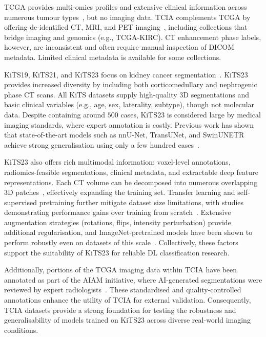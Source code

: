 TCGA provides multi-omics profiles and extensive clinical information across numerous tumour types~\cite{weinstein2013cancer}, but no imaging data. TCIA complements TCGA by offering de-identified CT, MRI, and PET imaging~\cite{clark2013cancer}, including collections that bridge imaging and genomics (e.g., TCGA-KIRC). CT enhancement phase labels, however, are inconsistent and often require manual inspection of DICOM metadata. Limited clinical metadata is available for some collections.

KiTS19, KiTS21, and KiTS23 focus on kidney cancer segmentation~\cite{kitsIntro}. KiTS23 provides increased diversity by including both corticomedullary and nephrogenic phase CT scans. All KiTS datasets supply high-quality 3D segmentations and basic clinical variables (e.g., age, sex, laterality, subtype), though not molecular data. Despite containing around $500$ cases, KiTS23 is considered large by medical imaging standards, where expert annotation is costly. Previous work has shown that state-of-the-art models such as nnU-Net, TransUNet, and SwinUNETR achieve strong generalisation using only a few hundred cases~\cite{isensee2021nnu}.

KiTS23 also offers rich multimodal information: voxel-level annotations, radiomics-feasible segmentations, clinical metadata, and extractable deep feature representations. Each CT volume can be decomposed into numerous overlapping 3D patches~\cite{wolf2023self}, effectively expanding the training set. Transfer learning and self-supervised pretraining further mitigate dataset size limitations, with studies demonstrating performance gains over training from scratch~\cite{tajbakhsh2016convolutional,kim2022transfer,wolf2023self,azizi2023robust}. Extensive augmentation strategies (rotations, flips, intensity perturbation) provide additional regularisation, and ImageNet-pretrained models have been shown to perform robustly even on datasets of this scale~\cite{maccin2025kidneynext}. Collectively, these factors support the suitability of KiTS23 for reliable DL classification research.

Additionally, portions of the TCGA imaging data within TCIA have been annotated as part of the AIAM initiative, where AI-generated segmentations were reviewed by expert radiologists~\cite{van2023image}. These standardised and quality-controlled annotations enhance the utility of TCIA for external validation. Consequently, TCIA datasets provide a strong foundation for testing the robustness and generalisability of models trained on KiTS23 across diverse real-world imaging conditions.

